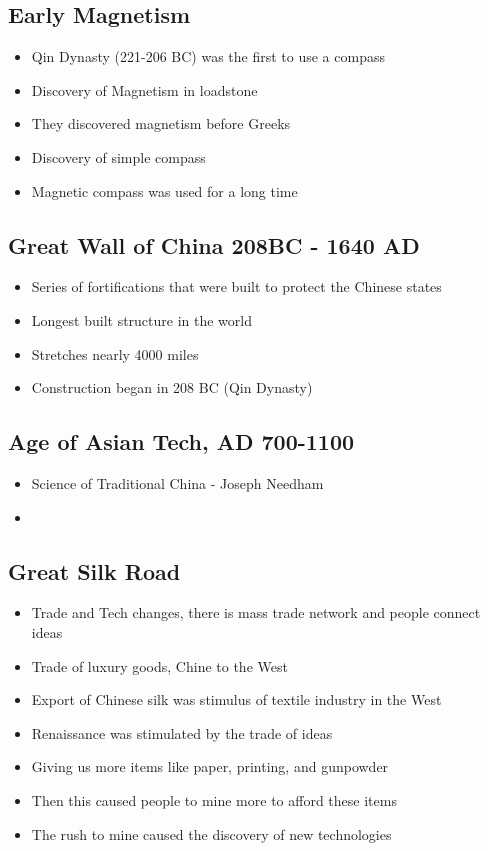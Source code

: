 \documentclass{article}
\begin{document}
\subsection{Early Magnetism}
\begin{itemize}
  \item Qin Dynasty (221-206 BC) was the first to use a compass
  \item Discovery of Magnetism in loadstone
  \item They discovered magnetism before Greeks
  \item Discovery of simple compass
  \item Magnetic compass was used for a long time
\end{itemize}

\subsection{Great Wall of China 208BC - 1640 AD}
\begin{itemize}
  \item Series of fortifications that were built to protect the Chinese states
  \item Longest built structure in the world
  \item Stretches nearly 4000 miles
  \item Construction began in 208 BC (Qin Dynasty)
\end{itemize}

\subsection{Age of Asian Tech, AD 700-1100}
\begin{itemize}
  \item Science of Traditional China - Joseph Needham
  \item
\end{itemize}

\subsection{Great Silk Road}
\begin{itemize}
  \item Trade and Tech changes, there is mass trade
    network and people connect ideas
  \item Trade of luxury goods, Chine to the West
  \item Export of Chinese silk was stimulus of textile industry in the West
  \item Renaissance was stimulated by the trade of ideas
  \item Giving us more items like paper, printing, and gunpowder
  \item Then this caused people to mine more to afford these items
  \item The rush to mine caused the discovery of new technologies
\end{itemize}
\end{document}
